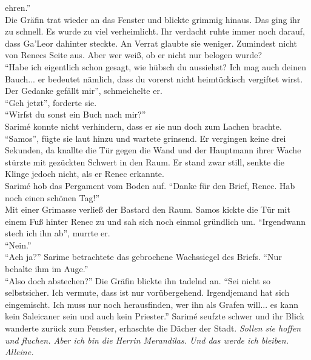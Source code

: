 ehren.''\\
Die Gräfin trat wieder an das Fenster und blickte grimmig hinaus. Das ging ihr zu schnell. Es wurde 
zu viel verheimlicht. Ihr verdacht ruhte immer noch darauf, dass Ga'Leor dahinter steckte. An 
Verrat glaubte sie weniger. Zumindest nicht von Renecs Seite aus. Aber wer weiß, ob er nicht nur 
belogen wurde?\\
``Habe ich eigentlich schon gesagt, wie hübsch du aussiehst? Ich mag auch deinen Bauch... er 
bedeutet nämlich, dass du vorerst nicht heimtückisch vergiftet wirst. Der Gedanke gefällt mir'', 
schmeichelte er.\\
``Geh jetzt'', forderte sie.\\
``Wirfst du sonst ein Buch nach mir?''\\
Sarimé konnte nicht verhindern, dass er sie nun doch zum Lachen brachte. ``Samos'', fügte sie laut 
hinzu und wartete grinsend. Er vergingen keine drei Sekunden, da knallte die Tür gegen die Wand und 
der Hauptmann ihrer Wache stürzte mit gezückten Schwert in den Raum. Er stand zwar still, senkte die 
Klinge jedoch nicht, als er Renec erkannte.\\
Sarimé hob das Pergament vom Boden auf. ``Danke für den Brief, Renec. Hab noch einen schönen 
Tag!''\\
Mit einer Grimasse verließ der Bastard den Raum. Samos kickte die Tür mit einem Fuß hinter Renec zu 
und sah sich noch einmal gründlich um. 
``Irgendwann stech ich ihn ab'', murrte er.\\
``Nein.''\\
``Ach ja?''
Sarime betrachtete das gebrochene Wachssiegel des Briefs. ``Nur behalte ihm im Auge.''\\
``Also doch abstechen?''
Die Gräfin blickte ihn tadelnd an. ``Sei nicht so selbstsicher. Ich vermute, dass ist nur 
vorübergehend. Irgendjemand hat sich eingemischt.  Ich muss nur noch herausfinden, wer ihn als 
Grafen will... es kann kein Saleicaner sein und auch kein Priester.'' Sarimé seufzte schwer und ihr 
Blick wanderte zurück zum Fenster, erhaschte die Dächer der Stadt. \textit{Sollen sie hoffen und 
fluchen. Aber ich bin die Herrin Merandilas. Und das werde ich bleiben. Alleine.}

